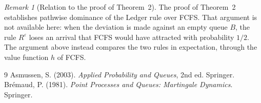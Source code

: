 \documentclass[11pt]{article}
\theoremstyle{definition}
\theoremstyle{remark}
\newtheorem{brem}[bthm]{Remark}
\newcommand{\Reps}{R^{\varepsilon}}
\begin{document}
\begin{brem}[Relation to the proof of Theorem~2]
The proof of Theorem~2 establishes pathwise dominance of the Ledger rule over
FCFS. That argument is not available here: when the deviation is made against
an empty queue $B$, the rule $\Reps$ loses an arrival that FCFS would have
attracted with probability $1/2$. The argument above instead compares the two
rules in expectation, through the value function $h$ of FCFS.
\end{brem}

\begin{thebibliography}{9}
 Asmussen, S. (2003). \emph{Applied Probability and Queues},
  2nd ed. Springer.
 Br\'emaud, P. (1981). \emph{Point Processes and Queues:
  Martingale Dynamics}. Springer.
\end{thebibliography}
\end{document}
